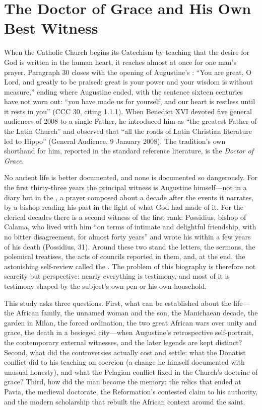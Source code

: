 \section{The Doctor of Grace and His Own Best Witness}

When the Catholic Church begins its Catechism by teaching that the desire for
God is written in the human heart, it reaches almost at once for one man's
prayer. Paragraph 30 closes with the opening of Augustine's
: ``You are great, O Lord, and greatly to be praised: great
is your power and your wisdom is without measure,'' ending where Augustine
ended, with the sentence sixteen centuries have not worn out: ``you have made
us for yourself, and our heart is restless until it rests in you'' (CCC 30,
citing  1.1.1). When Benedict XVI devoted five general
audiences of 2008 to a single Father, he introduced
him as ``the greatest Father of the Latin Church'' and observed that ``all the
roads of Latin Christian literature led to Hippo'' (General Audience, 9
January 2008). The tradition's own shorthand for him, reported in the standard
reference literature, is the \textit{Doctor of Grace}.

No ancient life is better documented, and none is documented so dangerously.
For the first thirty-three years the principal witness is Augustine
himself---not in a diary but in the , a prayer composed
about a decade after the events it narrates, by a bishop reading his past in
the light of what God had made of it. For the clerical decades there is a
second witness of the first rank: Possidius, bishop of Calama, who lived with
him ``on terms of intimate and delightful friendship, with no bitter
disagreement, for almost forty years'' and wrote his  within a few
years of his death (Possidius,  31). Around these two stand the
letters, the sermons, the polemical treatises, the acts of councils reported
in them, and, at the end, the astonishing self-review called the
. The problem of this biography is therefore not
scarcity but perspective: nearly everything is testimony, and most of it is
testimony shaped by the subject's own pen or his own household.

This study asks three questions. First, what can be established about the
life---the African family, the unnamed woman and the son, the Manichaean
decade, the garden in Milan, the forced ordination, the two great African
wars over unity and grace, the death in a besieged city---when Augustine's
retrospective self-portrait, the contemporary external witnesses, and the
later legends are kept distinct? Second, what did the controversies actually
cost and settle: what the Donatist conflict did to his teaching on coercion
(a change he himself documented with unusual honesty), and what the Pelagian
conflict fixed in the Church's doctrine of grace? Third, how did the man
become the memory: the relics that ended at Pavia, the medieval doctorate,
the Reformation's contested claim to his authority, and the modern
scholarship that rebuilt the African context around the saint.

